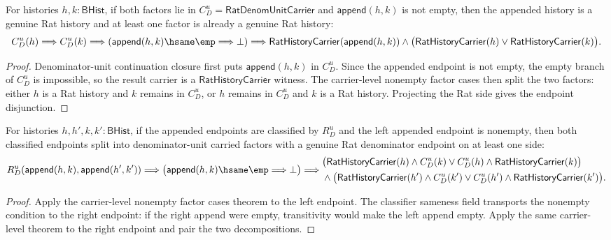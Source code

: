 \begin{theorem}
\label{thm:rat-denom-unit-append-nonempty-rat-endpoint-pair}
For histories $h,k:\mathsf{BHist}$, if both factors lie in
$C_D^u=\mathsf{RatDenomUnitCarrier}$ and
$\mathsf{append}(h,k)$ is not empty, then the appended history is a genuine
Rat history and at least one factor is already a genuine Rat history:
$$
C_D^u(h)\Longrightarrow C_D^u(k)\Longrightarrow
(\mathsf{append}(h,k)\hsame\emp\Longrightarrow\bot)\Longrightarrow
\mathsf{RatHistoryCarrier}(\mathsf{append}(h,k))\land
\bigl(\mathsf{RatHistoryCarrier}(h)\lor\mathsf{RatHistoryCarrier}(k)\bigr).
$$
\end{theorem}
\begin{proof}
Denominator-unit continuation closure first puts $\mathsf{append}(h,k)$ in
$C_D^u$. Since the appended endpoint is not empty, the empty branch of
$C_D^u$ is impossible, so the result carrier is a
$\mathsf{RatHistoryCarrier}$ witness. The carrier-level nonempty factor cases
then split the two factors: either $h$ is a Rat history and $k$ remains in
$C_D^u$, or $h$ remains in $C_D^u$ and $k$ is a Rat history. Projecting the
Rat side gives the endpoint disjunction.
\end{proof}

\begin{theorem}
\label{thm:rat-denom-unit-classifier-append-nonempty-factor-carriers}
For histories $h,h',k,k':\mathsf{BHist}$, if the appended endpoints are
classified by $R_D^u$ and the left appended endpoint is nonempty, then both
classified endpoints split into denominator-unit carried factors with a
genuine Rat denominator endpoint on at least one side:
$$
R_D^u(\mathsf{append}(h,k),\mathsf{append}(h',k'))
\Longrightarrow
\bigl(\mathsf{append}(h,k)\hsame\emp\Longrightarrow\bot\bigr)
\Longrightarrow
\begin{aligned}
&\bigl(\mathsf{RatHistoryCarrier}(h)\wedge C_D^u(k)
  \lor C_D^u(h)\wedge\mathsf{RatHistoryCarrier}(k)\bigr)\\
&{}\wedge
\bigl(\mathsf{RatHistoryCarrier}(h')\wedge C_D^u(k')
  \lor C_D^u(h')\wedge\mathsf{RatHistoryCarrier}(k')\bigr).
\end{aligned}
$$
\end{theorem}
\begin{proof}
Apply the carrier-level nonempty factor cases theorem to the left endpoint.
The classifier sameness field transports the nonempty condition to the right
endpoint: if the right append were empty, transitivity would make the left
append empty. Apply the same carrier-level theorem to the right endpoint and
pair the two decompositions.
\end{proof}

